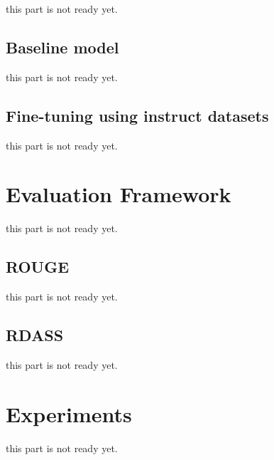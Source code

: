 \documentclass[sigconf]{acmart}
\begin{document}
this part is not ready yet.


\subsection{Baseline model}
this part is not ready yet.


\subsection{Fine-tuning using instruct datasets}
this part is not ready yet.



\section{Evaluation Framework}\label{evaluation_metrics}
this part is not ready yet.







\subsection{ROUGE} 
this part is not ready yet.

\subsection{RDASS} 
this part is not ready yet.



\section{Experiments}\label{experiments}
this part is not ready yet.
\end{document}
